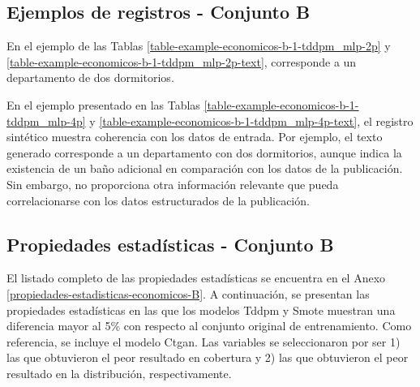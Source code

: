 \subsection{Ejemplos de registros - Conjunto B}
En el ejemplo de las Tablas \ref{table-example-economicos-b-1-tddpm_mlp-2p} y \ref{table-example-economicos-b-1-tddpm_mlp-2p-text}, corresponde a un departamento de dos dormitorios.



\newpage
En el ejemplo presentado en las Tablas \ref{table-example-economicos-b-1-tddpm_mlp-4p} y \ref{table-example-economicos-b-1-tddpm_mlp-4p-text}, el registro sintético muestra coherencia con los datos de entrada. Por ejemplo, el texto generado corresponde a un departamento con dos dormitorios, aunque indica la existencia de un baño adicional en comparación con los datos de la publicación. Sin embargo, no proporciona otra información relevante que pueda correlacionarse con los datos estructurados de la publicación.



\newpage
\subsection{Propiedades estadísticas - Conjunto B}
El listado completo de las propiedades estadísticas se encuentra en el Anexo \ref{propiedades-estadisticas-economicos-B}. A continuación, se presentan las propiedades estadísticas en las que los modelos Tddpm y Smote muestran una diferencia mayor al 5\% con respecto al conjunto original de entrenamiento. Como referencia, se incluye el modelo Ctgan. Las variables se seleccionaron por ser 1) las que obtuvieron el peor resultado en cobertura y 2) las que obtuvieron el peor resultado en la distribución, respectivamente.



